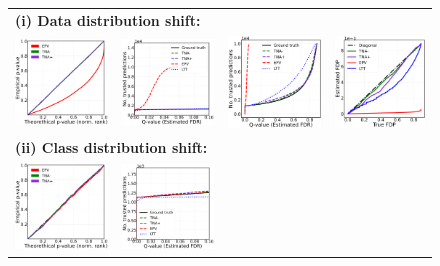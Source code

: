 \documentclass{article}
\begin{document}
\begin{figure}[h!]
	\centering
	\begin{tabular}{cccc}
		\multicolumn{4}{l}{\bf (i) Data distribution shift:}\\
		\includegraphics[width=0.225\linewidth, height=0.225\linewidth]{img/cnn_QQ_shifted.png}&
		\includegraphics[width=0.225\linewidth, height=0.225\linewidth]{img/cnn_shifted_fdr_control_loc.png} &
		\includegraphics[width=0.225\linewidth, height=0.225\linewidth]{img/cnn_shifted_fdr_control.png} & 
		\includegraphics[width=0.225\linewidth, height=0.225\linewidth]{img/cnn_FDPscat_shifted.png} \\
		\multicolumn{4}{l}{\bf (ii) Class distribution shift:}\\
		\includegraphics[width=0.225\linewidth, height=0.225\linewidth]{img/cnn_QQ_balanced.png}&
		\includegraphics[width=0.225\linewidth, height=0.225\linewidth]{img/cnn_balanced_fdr_control_loc.png} &

\end{tabular}
\end{figure}
\end{document}
